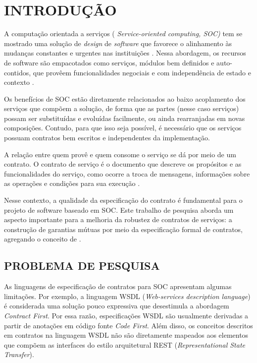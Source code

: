 

\chapter{INTRODUÇÃO}
\vspace{-6mm}

A computação orientada a serviços ( \emph{Service-oriented computing, SOC)} tem
se mostrado uma solução de \textit{design} de \textit{software} que favorece o
alinhamento às mudanças constantes e urgentes nas instituições
\cite{chen2008towards}. Nessa abordagem, os recursos de software são empacotados
como serviços, módulos bem definidos e auto-contidos, que provêem
funcionalidades negociais e com independência de estado e contexto
\cite{papazoglou2007service}.

Os benefícios de SOC estão diretamente relacionados ao
baixo acoplamento dos serviços que compõem a solução, de forma que as partes
(nesse caso serviços) possam ser substituídas e evoluídas facilmente, ou ainda
rearranjadas em novas composições. Contudo, para que isso seja possível, é
necessário que os serviços possuam contratos bem escritos e independentes da
implementação.

A relação entre quem provê e quem consome o serviço se
dá por meio de um contrato. O contrato de serviço é o documento que descreve os
propósitos e as funcionalidades do serviço, como ocorre a troca de mensagens,
informações sobre as operações e condições para sua execução \cite{erl2009web}.

Nesse contexto, a qualidade da especificação do contrato é fundamental para o
projeto de software baseado em SOC. Este trabalho de pesquisa aborda um aspecto
importante para a melhoria da robustez de contratos de serviços: a construção de
garantias mútuas por meio da especificação formal de contratos, agregando o
conceito de \designbycontract{}.

\section{PROBLEMA DE PESQUISA}
\vspace{-6mm}

As linguagens de especificação de contratos para SOC apresentam
algumas limitações. Por exemplo, a linguagem WSDL (\emph{Web-services
description language}) \cite{WSDLSite} é considerada uma solução
pouco expressiva que desestimula a abordagem \textit{Contract First}. Por essa
razão, especificações WSDL são usualmente derivadas a partir de anotações em código
fonte \textit{Code First}.
Além disso, os conceitos descritos em contratos na linguagem WSDL não são
diretamente mapeados aos elementos que compõem as interfaces do estilo
arquitetural REST\cite{fielding2000architectural} (\emph{Representational State Transfer}).

